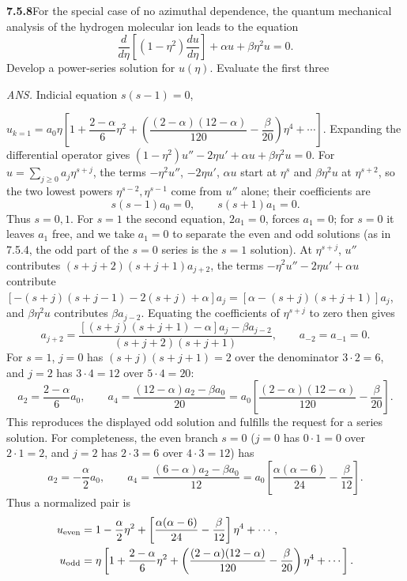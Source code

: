\par\bigskip
\noindent\textbf{7.5.8}\quad For the special case of no azimuthal dependence,
the quantum mechanical analysis of the hydrogen molecular ion leads to the
equation
\[
\frac{d}{d\eta}\left[(1-\eta^{2})\frac{du}{d\eta}\right]+\alpha u
+\beta\eta^{2}u=0.
\]
Develop a power-series solution for $u(\eta)$. Evaluate the first three
\par\nobreak\hfill\emph{ANS.}\enspace
Indicial equation $s(s-1)=0$,\par
\nobreak\hfill
$u_{k=1}=a_{0}\eta\left[1+\dfrac{2-\alpha}{6}\eta^{2}
+\left(\dfrac{(2-\alpha)(12-\alpha)}{120}-\dfrac{\beta}{20}\right)\eta^{4}
+\cdots\right]$.
\solution
Expanding the differential operator gives
$(1-\eta^2)u''-2\eta u'+\alpha u+\beta\eta^2u=0$.
For $u=\sum_{j\ge0}a_j\eta^{s+j}$, the terms $-\eta^2u''$, $-2\eta u'$,
$\alpha u$ start at $\eta^s$ and $\beta\eta^2u$ at $\eta^{s+2}$, so the
two lowest powers
$\eta^{s-2},\eta^{s-1}$ come from $u''$ alone; their coefficients are
\[
s(s-1)a_0=0,\qquad s(s+1)a_1=0.
\]
Thus $s=0,1$. For $s=1$ the second equation, $2a_1=0$, forces $a_1=0$;
for $s=0$ it leaves $a_1$ free, and we take $a_1=0$ to separate the even
and odd solutions (as in 7.5.4, the odd part of the $s=0$ series is the
$s=1$ solution). At $\eta^{s+j}$, $u''$ contributes
$(s+j+2)(s+j+1)a_{j+2}$, the terms $-\eta^2u''-2\eta u'+\alpha u$
contribute $[-(s+j)(s+j-1)-2(s+j)+\alpha]a_j=[\alpha-(s+j)(s+j+1)]a_j$,
and $\beta\eta^2u$ contributes $\beta a_{j-2}$. Equating the
coefficients of $\eta^{s+j}$ to zero then gives
\[
\boxed{a_{j+2}=
\frac{[(s+j)(s+j+1)-\alpha]a_j-\beta a_{j-2}}
{(s+j+2)(s+j+1)}},\qquad a_{-2}=a_{-1}=0.
\]
For $s=1$, $j=0$ has $(s+j)(s+j+1)=2$ over the denominator
$3\cdot2=6$, and $j=2$ has $3\cdot4=12$ over $5\cdot4=20$:
\[
a_2=\frac{2-\alpha}{6}a_0,\qquad
a_4=\frac{(12-\alpha)a_2-\beta a_0}{20}
=a_0\left[\frac{(2-\alpha)(12-\alpha)}{120}-\frac\beta{20}\right].
\]
This reproduces the displayed odd solution and fulfills the request for
a series solution. For completeness, the even branch $s=0$ ($j=0$ has
$0\cdot1=0$ over $2\cdot1=2$, and $j=2$ has $2\cdot3=6$ over
$4\cdot3=12$) has
\[
a_2=-\frac\alpha2a_0,\qquad
a_4=\frac{(6-\alpha)a_2-\beta a_0}{12}
=a_0\left[\frac{\alpha(\alpha-6)}{24}-\frac\beta{12}\right].
\]
Thus a normalized pair is
\begin{align*}
u_{\rm even}&=1-\frac\alpha2\eta^2
 +\left[\frac{\alpha(\alpha-6)}{24}-\frac\beta{12}\right]\eta^4+\cdots,\\
u_{\rm odd}&=\eta\left[1+\frac{2-\alpha}{6}\eta^2
 +\left(\frac{(2-\alpha)(12-\alpha)}{120}-\frac\beta{20}\right)\eta^4+\cdots\right].
\end{align*}

